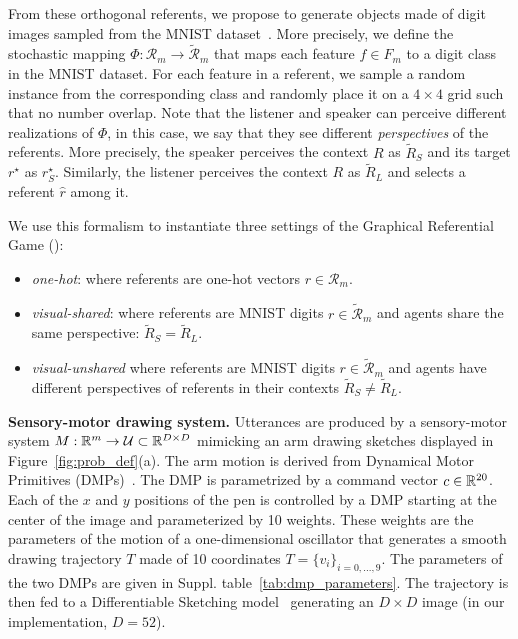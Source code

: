 From these orthogonal referents, we propose to generate objects made of digit images sampled from the MNIST dataset~\citep{LeCun1998GradientbasedLA}. More precisely, we define the stochastic mapping $\Phi: \mathcal{R}_m \rightarrow \tilde{\mathcal{R}}_m$ that maps each feature $f \in F_m$ to a digit class in the MNIST dataset. For each feature in a referent, we sample a random instance from the corresponding class and randomly place it on a $4\times4$ grid such that no number overlap. Note that the listener and speaker can perceive different realizations of $\Phi$, in this case, we say that they see different \textit{perspectives} of the referents. More precisely, the speaker perceives the context $R$ as $\tilde{R}_S$ and its target $r^\star$ as $r^\star_S$. Similarly, the listener perceives the context $R$ as $\tilde{R}_L$ and selects a referent $\hat{r}$ among it.

We use this formalism to instantiate three settings of the Graphical Referential Game (\greg):
\begin{itemize}[noitemsep,topsep=0pt]
    \item \textit{one-hot}: where referents are one-hot vectors $r \in \mathcal{R}_m$.
    \item \textit{visual-shared}: where referents are MNIST digits $r \in \tilde{\mathcal{R}}_m$ and agents share the same perspective: $\tilde{R}_S = \tilde{R}_L$.
    \item \textit{visual-unshared} where referents are MNIST digits $r \in \tilde{\mathcal{R}}_m$ and agents have different perspectives of referents in their contexts $\tilde{R}_S \neq \tilde{R}_L$.
\end{itemize}


\noindent\textbf{Sensory-motor drawing system.} 
Utterances are produced by a sensory-motor system ${M: \mathbb{R}^m \rightarrow \mathcal{U} \subset \mathbb{R}^{D\times D}}$ mimicking an arm drawing sketches displayed in Figure~\ref{fig:prob_def}(a). The arm motion is derived from Dynamical Motor Primitives (DMPs)~\citep{schaal2006dynamic}. The DMP is parametrized by a command vector $c\in\mathbb{R}^{20}$. Each of the $x$ and $y$ positions of the pen is controlled by a DMP starting at the center of the image and parameterized by 10 weights. These weights are the parameters of the motion of a one-dimensional oscillator that generates a smooth drawing trajectory $T$ made of 10 coordinates $T=\{v_i\}_{i=0,...,9}$. The parameters of the two DMPs are given in Suppl. table~\ref{tab:dmp_parameters}. The trajectory is then fed to a Differentiable Sketching model~\citep{Mihai2021DifferentiableDA} generating an $D\times D$ image (in our implementation, $D=52$). %

